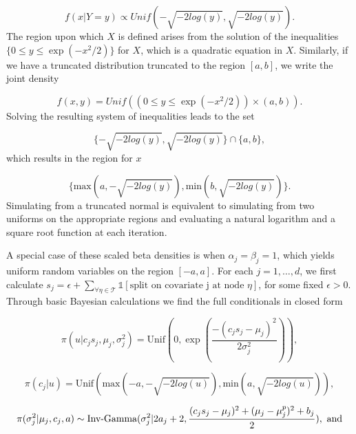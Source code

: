  \begin{equation}
f(x\vert Y=y) \propto Unif(-\sqrt{-2log(y)}, \sqrt{-2log(y)}).
\end{equation}
The region upon which $X$ is defined arises from the solution of the inequalities $\{0\leq y \leq \exp{(-x^2/2)} \} $ for $X$, which is a quadratic equation in $X$. Similarly, if we have a truncated distribution truncated to the region $[a,b]$, we write the joint density 
 
 \begin{equation}
 f(x,y)=Unif((0\leq y\leq \exp{(-x^2/2)})\times (a,b)).
 \end{equation}
 Solving the resulting system of inequalities leads to the set 
 
 \begin{equation}
 \{-\sqrt{-2log(y)}, \sqrt{-2log(y)} \} \cap \{a, b\},
 \end{equation}
which results in the region for $x$

\begin{equation}
 \{\text{max}(a,-\sqrt{-2log(y)}), \text{min}(b,\sqrt{-2log(y)} )\} .
 \end{equation}
 Simulating from a truncated normal is equivalent to simulating from two uniforms on the appropriate regions and evaluating a natural logarithm and a square root function at each iteration. 
 
 A special case of these scaled beta densities is when $\alpha_j=\beta_j=1$, which yields uniform random variables on the region $[-a,a]$. 
For each $j=1, \dots, d$, we first calculate $s_j = \epsilon+\sum_{\forall \eta \in \mathcal{T}}\mathds{1}[\text{split on covariate j at node $\eta$}]$, for some fixed $\epsilon>0$.
Through basic Bayesian calculations we find the full conditionals in closed form
 
\begin{equation}\label{eqn:u_given_cjsj}
\pi(u \vert c_js_j, \mu_j, \sigma_j^2)= \text{Unif}(0, \exp{(\frac{-(c_js_j-\mu_j)^2}{2\sigma_j^2} )}),
\end{equation}

\begin{equation}
\pi(c_j \vert u) = \text{Unif}(\text{max}(-a,-\sqrt{-2log(u)}), \text{min}(a,\sqrt{-2log(u)} )),
\end{equation}

\begin{equation}
\pi(\sigma^2_j \vert \mu_j, c_j, a) \sim \text{Inv-Gamma}({\sigma_j^2}\vert{2a_j+2},{\frac{(c_js_j-\mu_j)^2+ (\mu_j-\mu_j^p)^2+b_j}{2}}), \text{ and}
\end{equation}

